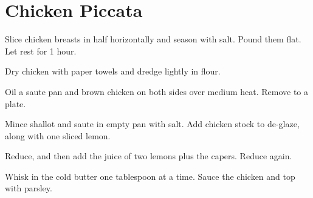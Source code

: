 \section{Chicken Piccata}
\begin{recipe}


Slice chicken breasts in half horizontally and season with salt. Pound them flat. Let rest for 1 hour.


Dry chicken with paper towels and dredge lightly in flour. 

Oil a saute pan and brown chicken on both sides over medium heat. Remove to a plate. 


Mince shallot and saute in empty pan with salt. Add chicken stock to de-glaze, along with one sliced lemon.

Reduce, and then add the juice of two lemons plus the capers. Reduce again. 


Whisk in the cold butter one tablespoon at a time. Sauce the chicken and top with parsley. 

\end{recipe}
